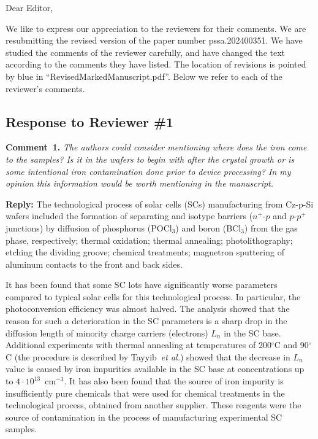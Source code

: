 \documentclass{WileyMSP-template}
\begin{document}
Dear Editor,

We like to express our appreciation to the reviewers for their comments.
We are resubmitting the revised version of the paper number pssa.202400351.
We have studied the comments of the reviewer carefully, and have changed the text according to the comments they
have listed.
The location of revisions is pointed by blue in ``RevisedMarkedManuscript.pdf''.
Below we refer to each of the reviewer’s comments.


\subsection*{Response to Reviewer \#1 }

\noindent
\textcolor[rgb]{0.00,0.50,1.00}{\textbf{Comment~1.}}
\emph{The authors could consider mentioning where does the iron come to the samples?
Is it in the wafers to begin with after the crystal growth or is some intentional iron contamination done prior to device processing?
In my opinion this information would be worth mentioning in the manuscript.}

\noindent
\textcolor[rgb]{0.51,0.00,0.00}{\textbf{Reply:}}
The technological process of solar cells (SCs) manufacturing from Cz-p-Si wafers included the formation of separating and isotype barriers
($n^+$-$p$ and $p$-$p^+$ junctions) by diffusion of phosphorus (POCl$_3$) and boron (BCl$_3$) from the gas phase, respectively;
thermal oxidation;
thermal annealing;
photolithography;
etching the dividing groove;
chemical treatments;
magnetron sputtering of aluminum contacts to the front and back sides.

It has been found that some SC lots have significantly worse parameters compared to typical solar cells for this technological process.
In particular, the photoconversion efficiency was almost halved.
The analysis showed that the reason for such a deterioration in the SC parameters is a sharp drop in the diffusion length of minority charge carriers (electrons) $L_n$ in the SC base.
Additional experiments with thermal annealing at temperatures of 200$^\circ$C and 90$^\circ$C
(the procedure is described by Tayyib~\emph{et al.}\cite{TAYYIB201221})
showed that the decrease in $L_n$ value is caused by iron impurities available in the SC base at concentrations up to $4\cdot10^{13}$~cm$^{-3}$.
It has also been found that the source of iron impurity is insufficiently pure chemicals that were used for chemical treatments in the technological process, obtained from another supplier.
These reagents were the source of contamination in the process of manufacturing experimental SC samples.
\end{document}
